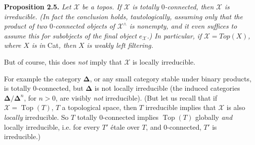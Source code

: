 \documentclass[11pt]{article}
\newcommand{\msp}[1]{\marginpar{\footnotesize [#1]}}
\newcommand{\sX}{\mathcal{X}} %
\begin{document}
\noindent\textbf{Proposition 2.5.} \textit{Let $\sX$ be a topos. If $\sX$ is totally $0$-connected, then $\sX$ is irreducible. (In fact the conclusion holds, tautologically, assuming only that the product of two $0$-connected objects of $\sX^{\wedge}$ is nonempty, and it even suffices to assume this for subobjects of the final object $e_{\sX}$.) In particular, if $\sX = \mathit{Top}(X)$, where $X$ is in} Cat\textit{, then $X$ is weakly left filtering.}

But of course, this does \textit{not} imply that $\sX$ is locally irreducible.

\msp{page 19}

\noindent For example the category $\boldsymbol{\Delta}$, or any small category stable under binary products, is totally 0-connected, but $\boldsymbol{\Delta}$ is not locally irreducible (the induced categories $\boldsymbol{\Delta}/\boldsymbol{\Delta}^n$, for $n > 0$, are visibly \textit{not} irreducible). (But let us recall that if $\sX = \operatorname{Top}(T)$, $T$ a topological space, then $T$ irreducible implies that $\sX$ is also \textit{locally} irreducible. So $T$ totally 0-connected implies $\operatorname{Top}(T)$ globally \textit{and} locally irreducible, i.e. for every $T'$ étale over $T$, and 0-connected, $T'$ is irreducible.)
\end{document}
